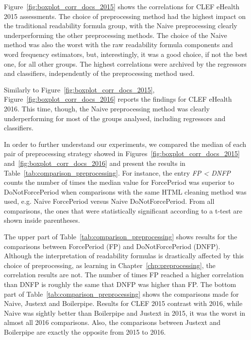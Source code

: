 Figure~\ref{fig:boxplot_corr_docs_2015} shows the correlations for CLEF eHealth 2015 assessments.
The choice of preprocessing method had the highest impact on the traditional readability formula group, with the Naive preprocessing clearly underperforming the other preprocessing methods. The choice of the Naive method was also the worst with the raw readability formula components and word frequency estimators, but, interestingly, it was a good choice, if not the best one, for all other groups.
The highest correlations were archived by the regressors and classifiers, independently of the preprocessing method used.


Similarly to Figure~\ref{fig:boxplot_corr_docs_2015}, Figure~\ref{fig:boxplot_corr_docs_2016} reports the findings for CLEF eHealth 2016. This time, though, the Naive preprocessing method was clearly underperforming for most of the groups analysed, including regressors and classifiers.

In order to further understand our experiments, we compared the median of each pair of preprocessing strategy showed in Figures~\ref{fig:boxplot_corr_docs_2015} and~\ref{fig:boxplot_corr_docs_2016} and present the results in Table~\ref{tab:comparison_preprocessing}. 
For instance, the entry \textit{FP < DNFP} counts the number of times the median value for ForcePeriod was superior to DoNotForcePeriod when comparisons with the same HTML cleaning method was used, e.g. Naive ForcePeriod versus Naive DoNotForcePeriod. From all comparisons, the ones that were statistically significant according to a t-test are shown inside parentheses.

The upper part of Table~\ref{tab:comparison_preprocessing} shows results for the comparisons between ForcePeriod (FP) and DoNotForcePeriod (DNFP). Although the interpretation of readability formulas is drastically affected by this choice of preprocessing, as learning in Chapter~\ref{chp:preprocessing}, the correlation results are not.
The number of times FP reached a higher correlation than DNFP is roughly the same that DNFP was higher than FP.
The bottom part of Table~\ref{tab:comparison_preprocessing} shows the comparisons made for Naive, Justext and Boilerpipe. Results for CLEF 2015 contrast with 2016, while Naive was sightly better than Boilerpipe and Justext in 2015, it was the worst in almost all 2016 comparisons. Also, the comparisons between Justext and Boilerpipe are exactly the opposite from 2015 to 2016.

